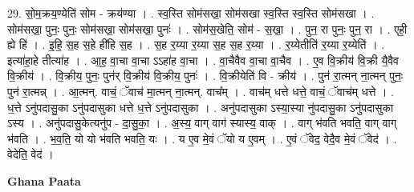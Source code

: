 \documentclass[17pt]{extarticle}
\begin{document}
29. सो॒म॒क्रय॒ण्येति॑ सोम - क्रय॑ण्या । . स्व॒स्ति सोम॑सखा॒ सोम॑सखा स्व॒स्ति स्व॒स्ति सोम॑सखा । . सोम॑सखा॒ पुनः॒ पुनः॒ सोम॑सखा॒ सोम॑सखा॒ पुनः॑ । . सोम॑स॒खेति॒ सोम॑ - स॒खा॒ । . पुन॒ रा पुनः॒ पुन॒ रा । . एही॒ ह्ये हि॑ । . इ॒हि॒ स॒ह स॒हे ही॑हि स॒ह । . स॒ह र॒य्या र॒य्या स॒ह स॒ह र॒य्या । . र॒य्येतीति॑ र॒य्या र॒य्येति॑ । . इत्या॑हा॒हे तीत्या॑ह । . आ॒ह॒ वा॒चा वा॒चा ऽऽहा॑ह वा॒चा । . वा॒चैवैव वा॒चा वा॒चैव । . ए॒व वि॒क्रीय॑ वि॒क्री यै॒वैव वि॒क्रीय॑ । . वि॒क्रीय॒ पुनः॒ पुन॑र् वि॒क्रीय॑ वि॒क्रीय॒ पुनः॑ । . वि॒क्रीयेति॑ वि - क्रीय॑ । . पुन॑ रा॒त्मन् ना॒त्मन् पुनः॒ पुन॑ रा॒त्मन्न् । . आ॒त्मन्. वाचं॒ ॅवाच॑ मा॒त्मन् ना॒त्मन्. वाच᳚म् । . वाच॑म् धत्ते धत्ते॒ वाचं॒ ॅवाच॑म् धत्ते । . ध॒त्ते ऽनु॑पदासु॒का ऽनु॑पदासुका धत्ते ध॒त्ते ऽनु॑पदासुका । . अनु॑पदासुका ऽस्या॒स्या नु॑पदासु॒का ऽनु॑पदासुका ऽस्य । . अनु॑पदासु॒केत्यनु॑प - दा॒सु॒का॒ । . अ॒स्य॒ वाग् वाग॑ स्यास्य॒ वाक् । . वाग् भ॑वति भवति॒ वाग् वाग् भ॑वति । . भ॒व॒ति॒ यो यो भ॑वति भवति॒ यः । . य ए॒व मे॒वं ॅयो य ए॒वम् । . ए॒वं ॅवेद॒ वेदै॒व मे॒वं ॅवेद॑ । . वेदेति॒ वेद॑ । \newline

\textbf{Ghana Paata } \newline
\end{document}
